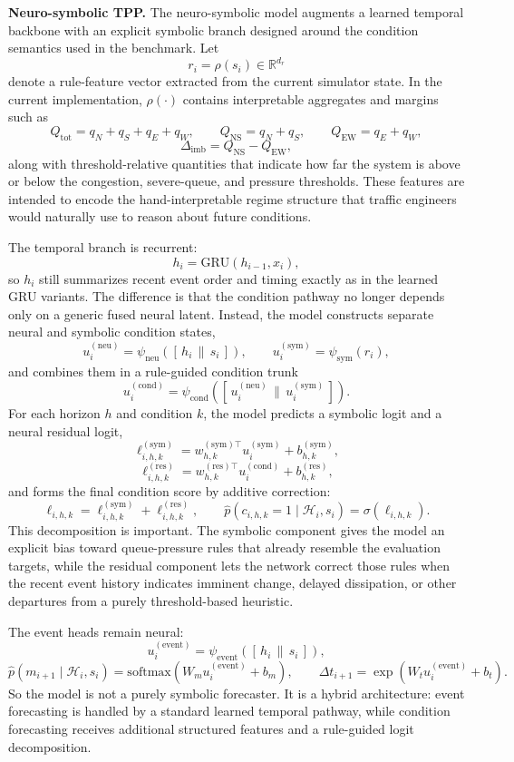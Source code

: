 \documentclass[11pt]{article}
\begin{document}
\textbf{Neuro-symbolic TPP.}
The neuro-symbolic model augments a learned temporal backbone with an explicit symbolic branch designed around the condition semantics used in the benchmark. Let
\[
r_i = \rho(s_i) \in \mathbb{R}^{d_r}
\]
denote a rule-feature vector extracted from the current simulator state. In the current implementation, \(\rho(\cdot)\) contains interpretable aggregates and margins such as
\[
Q_{\mathrm{tot}} = q_N + q_S + q_E + q_W, \qquad
Q_{\mathrm{NS}} = q_N + q_S, \qquad
Q_{\mathrm{EW}} = q_E + q_W,
\]
\[
\Delta_{\mathrm{imb}} = Q_{\mathrm{NS}} - Q_{\mathrm{EW}},
\]
along with threshold-relative quantities that indicate how far the system is above or below the congestion, severe-queue, and pressure thresholds. These features are intended to encode the hand-interpretable regime structure that traffic engineers would naturally use to reason about future conditions.

The temporal branch is recurrent:
\[
h_i = \mathrm{GRU}(h_{i-1}, x_i),
\]
so \(h_i\) still summarizes recent event order and timing exactly as in the learned GRU variants. The difference is that the condition pathway no longer depends only on a generic fused neural latent. Instead, the model constructs separate neural and symbolic condition states,
\[
u_i^{(\mathrm{neu})} = \psi_{\mathrm{neu}}([\, h_i \, \| \, s_i \,]),
\qquad
u_i^{(\mathrm{sym})} = \psi_{\mathrm{sym}}(r_i),
\]
and combines them in a rule-guided condition trunk
\[
u_i^{(\mathrm{cond})} = \psi_{\mathrm{cond}}([\, u_i^{(\mathrm{neu})} \, \| \, u_i^{(\mathrm{sym})} \,]).
\]
For each horizon \(h\) and condition \(k\), the model predicts a symbolic logit and a neural residual logit,
\[
\ell_{i,h,k}^{(\mathrm{sym})} = {w}_{h,k}^{(\mathrm{sym})\top} u_i^{(\mathrm{sym})} + b_{h,k}^{(\mathrm{sym})},
\]
\[
\ell_{i,h,k}^{(\mathrm{res})} = {w}_{h,k}^{(\mathrm{res})\top} u_i^{(\mathrm{cond})} + b_{h,k}^{(\mathrm{res})},
\]
and forms the final condition score by additive correction:
\[
\ell_{i,h,k} = \ell_{i,h,k}^{(\mathrm{sym})} + \ell_{i,h,k}^{(\mathrm{res})},
\qquad
\hat{p}(c_{i,h,k}=1 \mid \mathcal{H}_i, s_i) = \sigma(\ell_{i,h,k}).
\]
This decomposition is important. The symbolic component gives the model an explicit bias toward queue-pressure rules that already resemble the evaluation targets, while the residual component lets the network correct those rules when the recent event history indicates imminent change, delayed dissipation, or other departures from a purely threshold-based heuristic.

The event heads remain neural:
\[
u_i^{(\mathrm{event})} = \psi_{\mathrm{event}}([\, h_i \, \| \, s_i \,]),
\]
\[
\hat{p}(m_{i+1}\mid \mathcal{H}_i, s_i) = \mathrm{softmax}(W_m u_i^{(\mathrm{event})} + b_m),
\qquad
\hat{\Delta t}_{i+1} = \exp(W_t u_i^{(\mathrm{event})} + b_t).
\]
So the model is not a purely symbolic forecaster. It is a hybrid architecture: event forecasting is handled by a standard learned temporal pathway, while condition forecasting receives additional structured features and a rule-guided logit decomposition.
\end{document}
